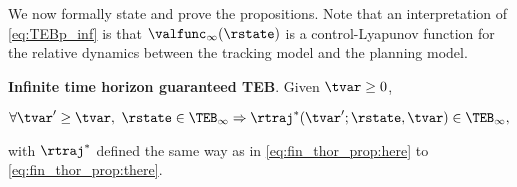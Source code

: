 We now formally state and prove the propositions. 
Note that an interpretation of \eqref{eq:TEBp_inf} is that $\valfunc_\infty(\rstate)$ is a control-Lyapunov function for the relative dynamics between the tracking model and the planning model.

\begin{prop}
  \label{prop:main}
  \textbf{Infinite time horizon guaranteed TEB}. Given $\tvar \ge 0$,
  
  \begin{equation}
  \forall \tvar' \ge \tvar, ~\rstate\in\TEB_\infty \Rightarrow \rtraj^*(\tvar'; \rstate, \tvar) \in \TEB_\infty,
  \end{equation}
  
  \noindent with $\rtraj^*$ defined the same way as in \eqref{eq:fin_thor_prop:here} to \eqref{eq:fin_thor_prop:there}.
  
\end{prop}


